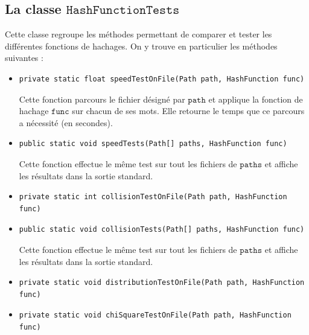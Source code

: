 \documentclass[12pt,a4paper,titlepage]{article}
\newcommand{\class}[1]{$\mathtt{#1}$}
\begin{document}
\subsection{La classe \class{HashFunctionTests}}
Cette classe regroupe les méthodes permettant de comparer et tester les différentes fonctions de hachages.
On y trouve en particulier les méthodes suivantes :
\begin{itemize}

\item \begin{lstlisting}
private static float speedTestOnFile(Path path, HashFunction func)
\end{lstlisting}
Cette fonction parcours le fichier désigné par \class{path} et applique la fonction de hachage \class{func} sur chacun de ses mots. Elle retourne le temps que ce parcours a nécessité (en secondes).

\item \begin{lstlisting}
public static void speedTests(Path[] paths, HashFunction func)
\end{lstlisting}
Cette fonction effectue le même test sur tout les fichiers de \class{paths} et affiche les résultats dans la sortie standard.

\item \begin{lstlisting}
private static int collisionTestOnFile(Path path, HashFunction func)
\end{lstlisting}

\item \begin{lstlisting}
public static void collisionTests(Path[] paths, HashFunction func)
\end{lstlisting}
Cette fonction effectue le même test sur tout les fichiers de \class{paths} et affiche les résultats dans la sortie standard.

\item \begin{lstlisting}
private static void distributionTestOnFile(Path path, HashFunction func)
\end{lstlisting}

\item \begin{lstlisting}
private static void chiSquareTestOnFile(Path path, HashFunction func)
\end{lstlisting}

\end{itemize}
\end{document}
